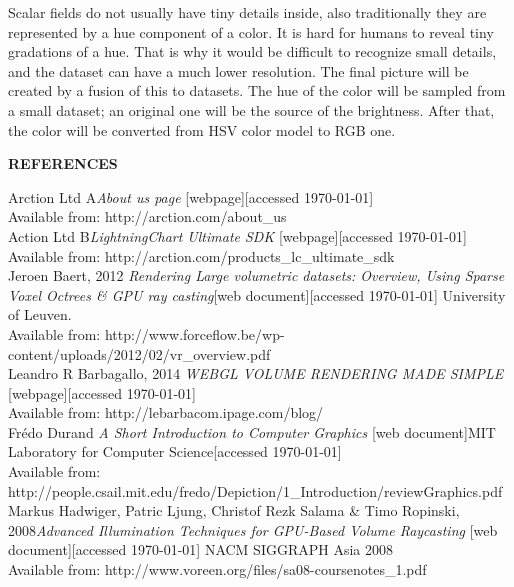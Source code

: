 \documentclass[twoside, english, 11pt]{report}
\begin{document}
Scalar fields do not usually have tiny details inside, also traditionally they are represented by a hue component of a color. It is hard for humans to reveal tiny gradations of a hue. That is why it would be difficult to recognize small details, and the dataset can have a much lower resolution. The final picture will be created by a fusion of this to datasets. The hue of the color will be sampled from a small dataset; an original one will be the source of the brightness. After that, the color will be converted from HSV color model to RGB one.


\newpage

\LARGE \textbf{REFERENCES}\\

\small Arction Ltd A\textit{About us page} [webpage][accessed \today] \\
Available from: http://arction.com/about\_us\\

\small Action Ltd B\textit{LightningChart Ultimate SDK} [webpage][accessed \today] \\
Available from: http://arction.com/products\_lc\_ultimate\_sdk\\

\small Jeroen Baert, 2012 \textit{Rendering Large volumetric datasets: Overview, Using Sparse Voxel Octrees \& GPU ray casting}[web document][accessed \today] University of Leuven.\\
Available from: http://www.forceflow.be/wp-content/uploads/2012/02/vr\_overview.pdf\\

\small Leandro R Barbagallo, 2014 \textit{WEBGL VOLUME RENDERING MADE SIMPLE} [webpage][accessed \today]\\ 
Available from: http://lebarbacom.ipage.com/blog/\\

\small Frédo Durand \textit{A Short Introduction to Computer Graphics} [web document]MIT Laboratory for Computer Science[accessed \today] \\
Available from: http://people.csail.mit.edu/fredo/Depiction/1\_Introduction/reviewGraphics.pdf\\

\small Markus Hadwiger, Patric Ljung, Christof Rezk Salama \& Timo Ropinski, 2008\textit{Advanced Illumination Techniques for GPU-Based Volume Raycasting} [web document][accessed \today] NACM SIGGRAPH Asia 2008 \\
Available from: http://www.voreen.org/files/sa08-coursenotes\_1.pdf\\
\end{document}
